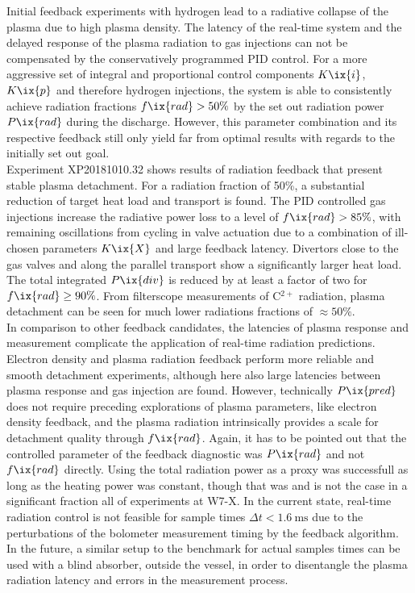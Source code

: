         Initial feedback experiments with hydrogen lead to a radiative collapse of the plasma due to high plasma density. The latency of the real-time system and the delayed response of the plasma radiation to gas injections can not be compensated by the conservatively programmed PID control. For a more aggressive set of integral and proportional control components $K\ix{i}$, $K\ix{p}$ and therefore hydrogen injections, the system is able to consistently achieve radiation fractions $f\ix{rad}>50\%$ by the set out radiation power $P\ix{rad}$ during the discharge. However, this parameter combination and its respective feedback still only yield far from optimal results with regards to the initially set out goal.\\%
        Experiment XP20181010.32 shows results of radiation feedback that present stable plasma detachment. For a radiation fraction of 50\%, a substantial reduction of target heat load and transport is found. The PID controlled gas injections increase the radiative power loss to a level of $f\ix{rad}>85\%$, with remaining oscillations from cycling in valve actuation due to a combination of ill-chosen parameters $K\ix{X}$ and large feedback latency. Divertors close to the gas valves and along the parallel transport show a significantly larger heat load. The total integrated $P\ix{div}$ is reduced by at least a factor of two for $f\ix{rad}\ge90\%$. From filterscope measurements of C$^{2+}$ radiation, plasma detachment can be seen for much lower radiations fractions of $\approx50\%$.\\%
        In comparison to other feedback candidates, the latencies of plasma response and measurement complicate the application of real-time radiation predictions. Electron density and plasma radiation feedback perform more reliable and smooth detachment experiments, although here also large latencies between plasma response and gas injection are found. However, technically $P\ix{pred}$ does not require preceding explorations of plasma parameters, like electron density feedback, and the plasma radiation intrinsically provides a scale for detachment quality through $f\ix{rad}$. Again, it has to be pointed out that the controlled parameter of the feedback diagnostic was $P\ix{rad}$ and not $f\ix{rad}$ directly. Using the total radiation power as a proxy was successfull as long as the heating power was constant, though that was and is not the case in a significant fraction all of experiments at W7-X. In the current state, real-time radiation control is not feasible for sample times $\Delta t<\SI{1.6}{\milli\second}$ due to the perturbations of the bolometer measurement timing by the feedback algorithm. In the future, a similar setup to the benchmark for actual samples times can be used with a blind absorber, outside the vessel, in order to disentangle the plasma radiation latency and errors in the measurement process.\\%
